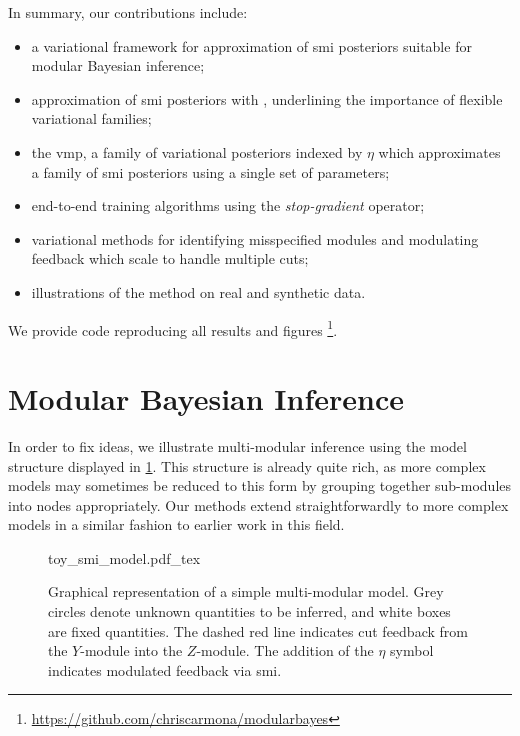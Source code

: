 In summary, our contributions include:\\[-0.25in]
\begin{itemize}
  \item a variational framework for approximation of \acrshort*{smi} posteriors suitable for modular Bayesian inference;
  \item approximation of \acrshort*{smi} posteriors with , underlining the importance of flexible variational families;
  \item the \acrfull*{vmp}, a family of variational posteriors indexed by $\eta$ which approximates a family of \acrshort*{smi} posteriors using a single set of parameters;
  \item end-to-end training algorithms using the \emph{stop-gradient} operator;
  \item variational methods for identifying misspecified modules and modulating feedback which scale to handle multiple cuts;
  \item illustrations of the method on real and synthetic data.\\[-0.25in]
\end{itemize}
We provide code reproducing all results and figures \footnote{\url{https://github.com/chriscarmona/modularbayes}}.

\section{Modular Bayesian Inference} \label{sec:mod_bayes}

In order to fix ideas, we illustrate multi-modular inference using the model structure displayed in \cref{fig:toy_multimodular_model}. 
This structure is already quite rich, as more complex models may sometimes be reduced to this form by grouping together sub-modules into nodes appropriately.
Our methods extend straightforwardly to more complex models in a similar fashion to earlier work in this field.

\begin{figure}[!htb]
  \centering
  \def\svgwidth{0.25\textwidth}
  {toy_smi_model.pdf_tex}
  \caption{
    Graphical representation of a simple multi-modular model.
    Grey circles denote unknown quantities to be inferred, and white boxes are fixed quantities.
    The dashed red line indicates cut feedback from the $Y$-module into the $Z$-module.
    The addition of the $\eta$ symbol indicates modulated feedback via \acrshort*{smi}.
  }
  \label{fig:toy_multimodular_model}
\end{figure}



